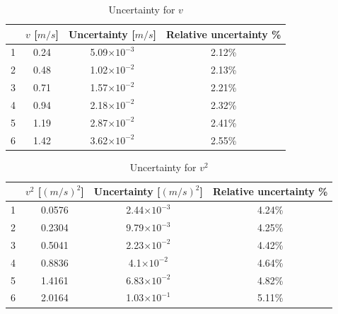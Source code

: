 \documentclass[12pt]{article}
\begin{document}
\begin{table}[H]
\centering
\begin{tabular}{|c|c|c|c|}
\hline
  & $v$ [$m/s$]   & Uncertainty [$m/s$] & Relative uncertainty \% \\ \hline
1 & 0.24 & 5.09$\times10^{-3}$              & 2.12\%                     \\ \hline
2 & 0.48     &1.02$\times10^{-2}$        &   2.13\%                      \\ \hline
3 & 0.71     & 1.57$\times10^{-2}$                 &  2.21\%                       \\ \hline
4 & 0.94     & 2.18$\times10^{-2}$                 &    2.32\%                     \\ \hline
5 & 1.19     & 2.87$\times10^{-2}$                 &    2.41\%                     \\ \hline
6 & 1.42     & 3.62$\times10^{-2}$                 &    2.55\%                     \\ \hline
\end{tabular}
\caption{Uncertainty for $v$}
\end{table}
\begin{table}[H]
\centering
\begin{tabular}{|c|c|c|c|}
\hline
  & $v^2$ [$(m/s)^2$]   & Uncertainty [$(m/s)^2$] & Relative uncertainty \% \\ \hline
1 & 0.0576 & 2.44$\times10^{-3}$              & 4.24\%                     \\ \hline
2 & 0.2304     &9.79$\times10^{-3}$        &   4.25\%                      \\ \hline
3 & 0.5041     & 2.23$\times10^{-2}$                 &  4.42\%                       \\ \hline
4 & 0.8836     & 4.1$\times10^{-2}$                 &    4.64\%                     \\ \hline
5 & 1.4161     & 6.83$\times10^{-2}$                 &    4.82\%                     \\ \hline
6 & 2.0164     & 1.03$\times10^{-1}$                 &    5.11\%                     \\ \hline
\end{tabular}
\caption{Uncertainty for $v^2$}
\end{table}
\end{document}
